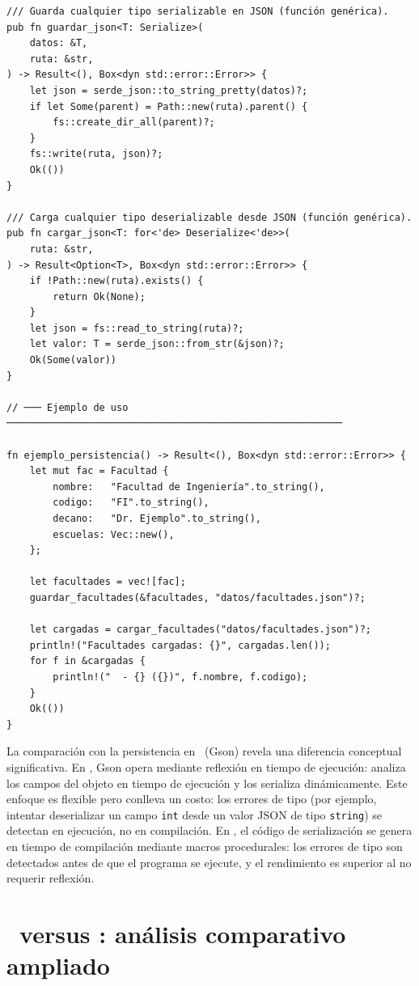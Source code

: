\begin{lstlisting}[style=rustStyle, caption={Persistencia con \texttt{serde} y \texttt{serde\_json}}, label={lst:serde}]
/// Guarda cualquier tipo serializable en JSON (función genérica).
pub fn guardar_json<T: Serialize>(
    datos: &T,
    ruta: &str,
) -> Result<(), Box<dyn std::error::Error>> {
    let json = serde_json::to_string_pretty(datos)?;
    if let Some(parent) = Path::new(ruta).parent() {
        fs::create_dir_all(parent)?;
    }
    fs::write(ruta, json)?;
    Ok(())
}

/// Carga cualquier tipo deserializable desde JSON (función genérica).
pub fn cargar_json<T: for<'de> Deserialize<'de>>(
    ruta: &str,
) -> Result<Option<T>, Box<dyn std::error::Error>> {
    if !Path::new(ruta).exists() {
        return Ok(None);
    }
    let json = fs::read_to_string(ruta)?;
    let valor: T = serde_json::from_str(&json)?;
    Ok(Some(valor))
}

// ─── Ejemplo de uso ──────────────────────────────────────────────────────────

fn ejemplo_persistencia() -> Result<(), Box<dyn std::error::Error>> {
    let mut fac = Facultad {
        nombre:   "Facultad de Ingeniería".to_string(),
        codigo:   "FI".to_string(),
        decano:   "Dr. Ejemplo".to_string(),
        escuelas: Vec::new(),
    };

    let facultades = vec![fac];
    guardar_facultades(&facultades, "datos/facultades.json")?;

    let cargadas = cargar_facultades("datos/facultades.json")?;
    println!("Facultades cargadas: {}", cargadas.len());
    for f in &cargadas {
        println!("  - {} ({})", f.nombre, f.codigo);
    }
    Ok(())
}
\end{lstlisting}

\noindent
La comparación con la persistencia en \java\ (Gson) revela una diferencia conceptual
significativa. En \java, Gson opera mediante reflexión en tiempo de ejecución: analiza
los campos del objeto en tiempo de ejecución y los serializa dinámicamente. Este enfoque
es flexible pero conlleva un costo: los errores de tipo (por ejemplo, intentar deserializar
un campo \texttt{int} desde un valor JSON de tipo \texttt{string}) se detectan en ejecución,
no en compilación. En \rust, el código de serialización se genera en tiempo de compilación
mediante macros procedurales: los errores de tipo son detectados antes de que el programa
se ejecute, y el rendimiento es superior al no requerir reflexión.

\section{\java\ versus \rust: análisis comparativo ampliado}
\label{sec:rust-java-comparacion}


